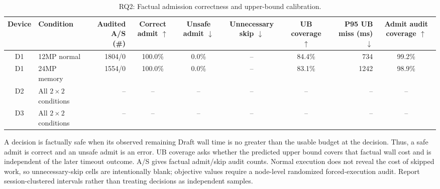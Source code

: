 \begin{table}[t]
  \centering
  \caption{RQ2: Factual admission correctness and upper-bound calibration.}
  \label{tab:rq2_admission_correctness}
  {\small
  \setlength{\tabcolsep}{4.0pt}%
  \renewcommand{\arraystretch}{1.12}%
  \begin{tabular}{@{}c l r c c c c r c@{}}
    \toprule
    \textbf{Device} & \textbf{Condition} &
    \makecell{\textbf{Audited A/S}\\\textbf{(\#)}} &
    \makecell{\textbf{Correct}\\\textbf{admit} $\uparrow$} &
    \makecell{\textbf{Unsafe}\\\textbf{admit} $\downarrow$} &
    \makecell{\textbf{Unnecessary}\\\textbf{skip} $\downarrow$} &
    \makecell{\textbf{UB coverage}\\$\uparrow$} &
    \makecell{\textbf{P95 UB miss}\\\textbf{(ms)} $\downarrow$} &
    \makecell{\textbf{Admit audit}\\\textbf{coverage} $\uparrow$} \\
    \midrule
    D1 & 12MP normal & 1804/0 & 100.0\% & 0.0\% & -- &
      84.4\% & 734 & 99.2\% \\
    D1 & 24MP memory & 1554/0 & 100.0\% & 0.0\% & -- &
      83.1\% & 1242 & 98.9\% \\
    \midrule
    D2 & All $2{\times}2$ conditions & -- & -- & -- & -- & -- & -- & -- \\
    D3 & All $2{\times}2$ conditions & -- & -- & -- & -- & -- & -- & -- \\
    \bottomrule
  \end{tabular}%
  }
  \par\vspace{3pt}
  {\footnotesize A decision is factually safe when its observed remaining Draft
  wall time is no greater than the usable budget at the decision. Thus, a safe
  admit is correct and an unsafe admit is an error. UB coverage asks whether the
  predicted upper bound covers that factual wall cost and is independent of the
  later timeout outcome. A/S gives factual admit/skip audit counts. Normal
  execution does not reveal the cost of skipped work, so unnecessary-skip cells
  are intentionally blank; objective values require a node-level randomized
  forced-execution audit. Report session-clustered intervals rather than treating
  decisions as independent samples.}
\end{table}

